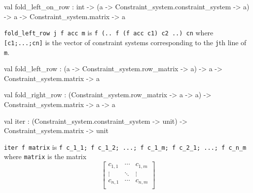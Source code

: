 \begin{ocamldocsigend}
\begin{ocamldocdescription}
\end{ocamldocdescription}


\label{val:Constraint-underscoresystem.Matrix.fold-underscoreleft-underscoreon-underscorerow}\begin{ocamldoccode}
val fold_left_on_row :
  int ->
  ({\textquotesingle}a -> Constraint_system.constraint_system -> {\textquotesingle}a) ->
  {\textquotesingle}a -> Constraint_system.matrix -> {\textquotesingle}a
\end{ocamldoccode}
\begin{ocamldocdescription}
{\tt{fold\_left\_row j f acc m}} is {\tt{f (.. f (f acc c1) c2 ..) cn}} where {\tt{[c1;...;cn]}} is the vector 
      of constraint systems corresponding to the {\tt{j}}th line of {\tt{m}}.


\end{ocamldocdescription}


\label{val:Constraint-underscoresystem.Matrix.fold-underscoreleft-underscorerow}\begin{ocamldoccode}
val fold_left_row :
  ({\textquotesingle}a -> Constraint_system.row_matrix -> {\textquotesingle}a) ->
  {\textquotesingle}a -> Constraint_system.matrix -> {\textquotesingle}a
\end{ocamldoccode}


\label{val:Constraint-underscoresystem.Matrix.fold-underscoreright-underscorerow}\begin{ocamldoccode}
val fold_right_row :
  (Constraint_system.row_matrix -> {\textquotesingle}a -> {\textquotesingle}a) ->
  Constraint_system.matrix -> {\textquotesingle}a -> {\textquotesingle}a
\end{ocamldoccode}


\label{val:Constraint-underscoresystem.Matrix.iter}\begin{ocamldoccode}
val iter :
  (Constraint_system.constraint_system -> unit) ->
  Constraint_system.matrix -> unit
\end{ocamldoccode}
\begin{ocamldocdescription}
{\tt{iter f matrix}} is {\tt{f c\_1\_1; f c\_1\_2; ...; f c\_1\_m; f c\_2\_1; ...; f c\_n\_m}} where {\tt{matrix}} is the matrix
      \[
      \left[
      \begin{array}{ccc}
      c_{1,1} & \cdots & c_{1,m} \\
      \vdots & \ddots & \vdots\\
      c_{n,1} & \cdots & c_{n,m} \\
      \end{array}
      \right]
      \]  



\end{ocamldocdescription}
\end{ocamldocsigend}
